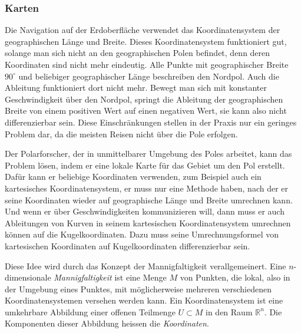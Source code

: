 \subsubsection{Karten}
Die Navigation auf der Erdoberfläche verwendet das Koordinatensystem
der geographischen Länge und Breite.
Dieses Koordinatensystem funktioniert gut, solange man sich nicht an
den geographischen Polen befindet, denn deren Koordinaten sind
nicht mehr eindeutig.
Alle Punkte mit geographischer Breite $90^\circ$ und beliebiger 
geographischer Länge beschreiben den Nordpol.
%
%
%
%
%
Auch die Ableitung funktioniert dort nicht mehr.
Bewegt man sich mit konstanter Geschwindigkeit über den Nordpol,
springt die Ableitung der geographischen Breite von einem positiven
Wert auf einen negativen Wert, sie kann also nicht differenzierbar sein.
Diese Einschränkungen stellen in der Praxis nur ein geringes Problem dar,
da die meisten Reisen nicht über die Pole erfolgen.

Der Polarforscher, der in unmittelbarer Umgebung des Poles arbeitet,
kann das Problem lösen, indem er eine lokale Karte für das Gebiet
um den Pol erstellt.
Dafür kann er beliebige Koordinaten verwenden, zum Beispiel auch
ein kartesisches Koordinatensystem, er muss nur eine Methode haben,
nach der er seine Koordinaten wieder auf geographische Länge und Breite
umrechnen kann.
Und wenn er über Geschwindigkeiten kommunizieren will, dann muss
er auch Ableitungen von Kurven in seinem kartesischen Koordinatensystem
umrechnen können auf die Kugelkoordinaten.
Dazu muss seine Umrechnungsformel von kartesischen Koordinaten
auf Kugelkoordinaten differenzierbar sein.

Diese Idee wird durch das Konzept der Mannigfaltigkeit verallgemeinert.
Eine $n$-dimensionale {\em Mannigfaltigkeit} ist eine Menge $M$ von Punkten,
die lokal, also in der Umgebung eines Punktes, mit möglicherweise mehreren
verschiedenen Koordinatensystemen versehen werden kann.
Ein Koordinatensystem ist eine umkehrbare Abbildung einer offenen Teilmenge
$U\subset M$ in den Raum $\mathbb{R}^n$.
Die Komponenten dieser Abbildung heissen die {\em Koordinaten}.
%

